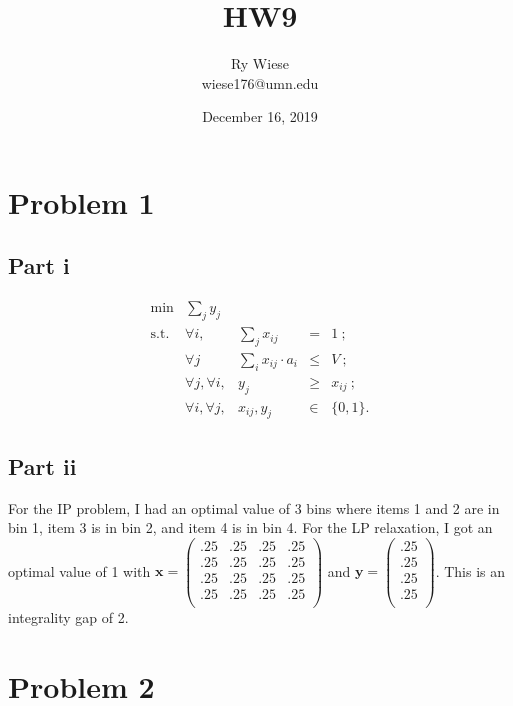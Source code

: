 \documentclass{article}
\title{HW9}
\author{Ry Wiese\\wiese176@umn.edu}
\date{December 16, 2019}
\begin{document}
\maketitle

\section{Problem 1}

\subsection{Part i}

\[
\begin{array}{rrrcl}
 \min & \sum_j y_j  &      &   \\
 \mbox{s.t.}  &  \forall i,  & \sum_j x_{ij}  & = & 1~; \\
              &  \forall j  & \sum_i x_{ij}\cdot a_i & \le & V~; \\
     & \forall j, \forall i, & y_j & \ge & x_{ij}~;\\
     & \forall i, \forall j, & x_{ij}, y_j & \in & \{0,1\}.
\end{array}
\]

\subsection{Part ii}

For the IP problem, I had an optimal value of 3 bins where items 1 and 2 are in bin 1, item 3 is in bin 2, and item 4 is in bin 4. For the LP relaxation, I got an optimal value of 1 with
$\mathbf{x} = 
\left(
\begin{array}{cccc}
.25 & .25 & .25 & .25\\
.25 & .25 & .25 & .25\\
.25 & .25 & .25 & .25\\
.25 & .25 & .25 & .25\\
\end{array}
\right)
$
and
$\mathbf{y} = 
\left(
\begin{array}{c}
.25\\
.25\\
.25\\
.25\\
\end{array}
\right)
$.
This is an integrality gap of 2.

\section{Problem 2}
\end{document}

